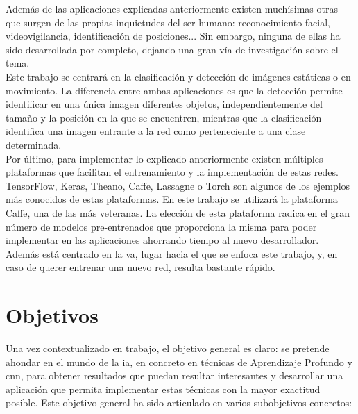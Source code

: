 Además de las aplicaciones explicadas anteriormente existen muchísimas otras que surgen de las propias inquietudes del ser humano: reconocimiento facial, videovigilancia, identificación de posiciones... Sin embargo, ninguna de ellas ha sido desarrollada por completo, dejando una gran vía de investigación sobre el tema.\\

Este trabajo se centrará en la clasificación y detección de imágenes estáticas o en movimiento. La diferencia entre ambas aplicaciones es que la detección permite identificar en una única imagen diferentes objetos, independientemente del tamaño y la posición en la que se encuentren, mientras que la clasificación identifica una imagen entrante a la red como perteneciente a una clase determinada.\\

Por último, para implementar lo explicado anteriormente existen múltiples plataformas que facilitan el entrenamiento y la implementación de estas redes. TensorFlow, Keras, Theano, Caffe, Lassagne o Torch son algunos de los ejemplos más conocidos de estas plataformas. En este trabajo se utilizará la plataforma Caffe, una de las más veteranas. La elección de esta plataforma radica en el gran número de modelos pre-entrenados que proporciona la misma para poder implementar en las aplicaciones ahorrando tiempo al nuevo desarrollador. Además está centrado en la \acrshort{va}, lugar hacia el que se enfoca este trabajo, y, en caso de querer entrenar una nuevo red, resulta bastante rápido.\\


\section{Objetivos} \label{sec.objetivos}
Una vez contextualizado en trabajo, el objetivo general es claro: se pretende ahondar en el mundo de la \acrshort{ia}, en concreto en técnicas de Aprendizaje Profundo y \acrshort{cnn}, para obtener resultados que puedan resultar interesantes y desarrollar una aplicación que permita implementar estas técnicas con la mayor exactitud posible. Este objetivo general ha sido  articulado en varios subobjetivos concretos: 

